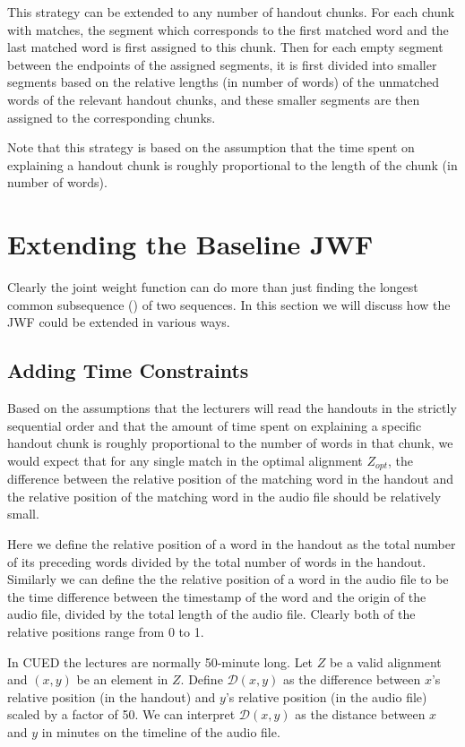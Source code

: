 This strategy can be extended to any number of handout chunks. For each chunk with matches, the segment which corresponds to the first matched word and the last matched word is first assigned to this chunk. Then for each empty segment between the endpoints of the assigned segments, it is first divided into smaller segments based on the relative lengths (in number of words) of the unmatched words of the relevant handout chunks, and these smaller segments are then assigned to the corresponding chunks.

Note that this strategy is based on the assumption that the time spent on explaining a handout chunk is roughly proportional to the length of the chunk (in number of words).


\section{Extending the Baseline JWF}

Clearly the joint weight function can do more than just finding the longest common subsequence () of two sequences. In this section we will discuss how the JWF could be extended in various ways.

\subsection{Adding Time Constraints}
\label{subsec:time-constraint}

Based on the assumptions that the lecturers will read the handouts in the strictly sequential order and that the amount of time spent on explaining a specific handout chunk is roughly proportional to the number of words in that chunk, we would expect that for any single match in the optimal alignment $Z_{opt}$, the difference between the relative position of the matching word in the handout and the relative position of the matching word in the audio file should be relatively small. 

Here we define the relative position of a word in the handout as the total number of its preceding words divided by the total number of words in the handout. Similarly we can define the the relative position of a word in the audio file to be the time difference between the timestamp of the word and the origin of the audio file, divided by the total length of the audio file. Clearly both of the relative positions range from 0 to 1.

In CUED the lectures are normally 50-minute long. Let $Z$ be a valid alignment and $(x,y)$ be an element in $Z$. Define $\mathcal{D}(x,y)$ as the difference between $x$'s relative position (in the handout) and $y$'s relative position (in the audio file) scaled by a factor of 50. We can interpret $\mathcal{D}(x,y)$ as the distance between $x$ and $y$ in minutes on the timeline of the audio file.

